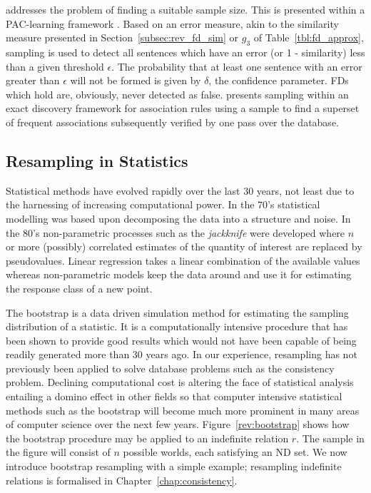\medskip

\cite{km94} addresses the problem of finding a suitable sample
size. This is presented within a PAC-learning framework
\cite{val84}. Based on an error measure, akin to the similarity
measure presented in Section~\ref{subsec:rev_fd_sim} or $g_3$ of
Table~\ref{tbl:fd_approx},  sampling is used to detect all sentences
which have an 
error (or 1 - similarity) less than a given threshold
$\epsilon$. The probability that at least one sentence with an error
greater than $\epsilon$ will not be formed is given by $\delta$, the
confidence parameter. FDs which hold are, obviously, never detected as
false. \cite{toi96b} presents sampling within an exact discovery
framework for association rules using a sample to find a superset of
frequent associations subsequently verified by one pass over the
database.


\subsection{Resampling in Statistics}\label{subsec:res_in_stat}
Statistical methods have evolved rapidly over
the last 30 years, not least due to the harnessing of increasing
computational power.  In the 70's statistical modelling was based upon
decomposing the data into a structure and noise.  In the 80's
non-parametric 
processes such as the {\em jackknife} were developed where $n$ or more
(possibly) correlated estimates of the quantity of interest are
replaced by pseudovalues. Linear regression takes a linear combination
of the available values whereas non-parametric models keep the data
around and use it for estimating the response class of a new point.


The bootstrap \cite{efro79,de83,et93} is a data driven
simulation method for estimating the sampling distribution of a
statistic. It is a computationally 
intensive procedure that has been shown to provide good results which
would not have been capable of being readily generated more than 30 years ago.
In our experience, resampling has not previously been 
applied to solve database problems such as the consistency problem.
Declining computational cost is altering the face of statistical analysis
entailing a domino effect in other fields so that computer
intensive statistical methods such as the bootstrap will become much
more prominent in many areas of computer science over the next few years.
Figure~\ref{rev:bootstrap} shows how the
bootstrap procedure may be applied to an indefinite relation $r$. The
sample in the figure will consist of $n$ possible worlds, each
satisfying an ND set. We now introduce bootstrap resampling with a
simple example; resampling indefinite relations is formalised in
Chapter~\ref{chap:consistency}. 

